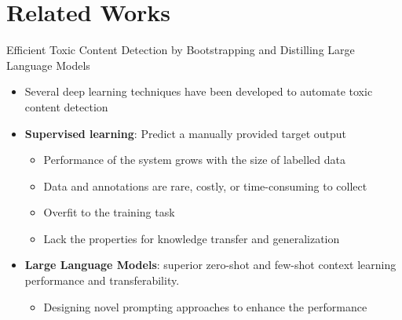 \section{Related Works}


\begin{frame}{Efficient Toxic Content Detection by Bootstrapping and Distilling Large Language Models}

\begin{itemize}

  \item Several deep learning techniques have been developed to automate toxic content detection 

  \item \textbf{Supervised learning}: Predict a manually provided target output
    \begin{itemize}
      \item Performance of the system grows with the size of labelled data 
      \item Data and annotations are rare, costly, or time-consuming to collect
      \item Overfit to the training task
      \item  Lack the properties for knowledge transfer and generalization
    \end{itemize}

  \item \textbf{Large Language Models}: superior zero-shot and few-shot context learning performance and transferability.
  \begin{itemize}
    \item Designing novel prompting approaches to enhance the performance
  \end{itemize}

\end{itemize}

\end{frame}


